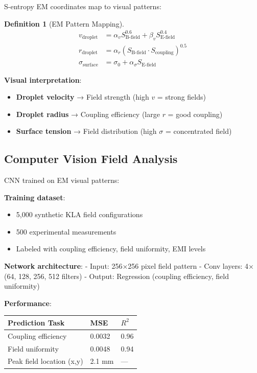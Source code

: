 \documentclass[12pt,a4paper]{article}
\newtheorem{definition}{Definition}
\begin{document}
S-entropy EM coordinates map to visual patterns:

\begin{definition}[EM Pattern Mapping]
\begin{align}
v_{\text{droplet}} &= \alpha_v S_{\text{B-field}}^{0.6} + \beta_v S_{\text{E-field}}^{0.4} \\
r_{\text{droplet}} &= \alpha_r (S_{\text{B-field}} \cdot S_{\text{coupling}})^{0.5} \\
\sigma_{\text{surface}} &= \sigma_0 + \alpha_\sigma S_{\text{E-field}}
\end{align}
\end{definition}

\textbf{Visual interpretation}:
\begin{itemize}
\item \textbf{Droplet velocity} → Field strength (high $v$ = strong fields)
\item \textbf{Droplet radius} → Coupling efficiency (large $r$ = good coupling)
\item \textbf{Surface tension} → Field distribution (high $\sigma$ = concentrated field)
\end{itemize}

\subsection{Computer Vision Field Analysis}

CNN trained on EM visual patterns:

\textbf{Training dataset}:
\begin{itemize}
\item 5,000 synthetic KLA field configurations
\item 500 experimental measurements
\item Labeled with coupling efficiency, field uniformity, EMI levels
\end{itemize}

\textbf{Network architecture}:
- Input: 256×256 pixel field pattern
- Conv layers: 4× (64, 128, 256, 512 filters)
- Output: Regression (coupling efficiency, field uniformity)

\textbf{Performance}:
\begin{center}
\begin{tabular}{|l|l|l|}
\hline
\textbf{Prediction Task} & \textbf{MSE} & \textbf{$R^2$} \\
\hline
Coupling efficiency & 0.0032 & 0.96 \\
Field uniformity & 0.0048 & 0.94 \\
Peak field location (x,y) & 2.1 mm & — \\
\hline
\end{tabular}
\end{center}
\end{document}
